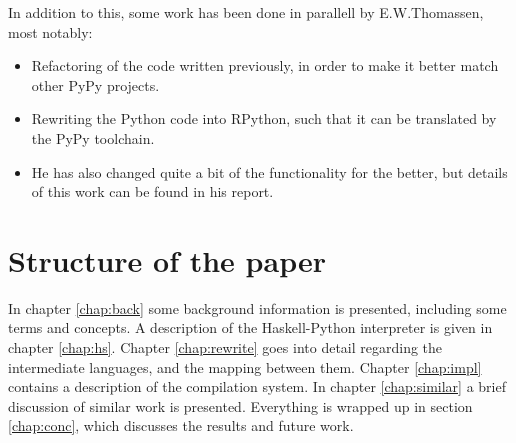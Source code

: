 In addition to this, some work has been done in parallell by E.W.Thomassen,
most notably:
\begin{itemize}

\item Refactoring of the code written previously, in order to make it better 
match other PyPy projects.

\item Rewriting the Python code into RPython, such that it can be translated by
the PyPy toolchain.

\item He has also changed quite a bit of the functionality for the better,
but details of this work can be found in his report.

\end{itemize}



\section{Structure of the paper}
In chapter \ref{chap:back} some background information is presented, including 
some terms and concepts. 
%
A description of the 
Haskell-Python interpreter is given in chapter \ref{chap:hs}.
%
Chapter \ref{chap:rewrite} goes into detail regarding the intermediate 
languages, and the mapping between them.
%
%
%
%
Chapter \ref{chap:impl} contains a description of the compilation system.
%
In chapter \ref{chap:similar} a brief discussion of similar work is presented.
%
Everything is wrapped up in section \ref{chap:conc}, which discusses 
the results and future work.
